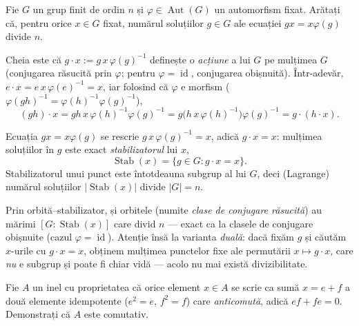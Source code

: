 \begin{problema}
Fie $G$ un grup finit de ordin $n$ și $\varphi\in\operatorname{Aut}(G)$
un automorfism fixat. Arătați că, pentru orice $x\in G$ fixat,
numărul soluțiilor $g\in G$ ale ecuației $gx=x\varphi(g)$ divide
$n$.
\end{problema}

\begin{solutie}
Cheia este că $g\cdot x:=g\,x\,\varphi(g)^{-1}$ definește o
\emph{acțiune} a lui $G$ pe mulțimea $G$ (conjugarea răsucită
prin $\varphi$; pentru $\varphi=\operatorname{id}$, conjugarea obișnuită).
Într-adevăr, $e\cdot x=e\,x\,\varphi(e)^{-1}=x$, iar folosind că
$\varphi$ e morfism ($\varphi(gh)^{-1}=\varphi(h)^{-1}\varphi(g)^{-1}$),
\[
  (gh)\cdot x=gh\,x\,\varphi(h)^{-1}\varphi(g)^{-1}
  =g\bigl(h\,x\,\varphi(h)^{-1}\bigr)\varphi(g)^{-1}=g\cdot(h\cdot x).
\]

Ecuația $gx=x\varphi(g)$ se rescrie $g\,x\,\varphi(g)^{-1}=x$, adică
$g\cdot x=x$: mulțimea soluțiilor în $g$ este exact
\emph{stabilizatorul} lui $x$,
\[
  \operatorname{Stab}(x)=\{g\in G : g\cdot x=x\}.
\]
Stabilizatorul unui punct este întotdeauna subgrup al lui $G$, deci
(Lagrange) numărul soluțiilor $|\!\operatorname{Stab}(x)|$ divide
$|G|=n$.
\end{solutie}

\begin{obs}
Prin orbită--stabilizator, și orbitele (numite \emph{clase de
conjugare răsucită}) au mărimi $[G:\operatorname{Stab}(x)]$ care
divid $n$ --- exact ca la clasele de conjugare obișnuite (cazul
$\varphi=\operatorname{id}$). Atenție însă la varianta
\emph{duală}: dacă fixăm $g$ și căutăm $x$-urile cu
$g\cdot x=x$, obținem mulțimea punctelor fixe ale permutării
$x\mapsto g\cdot x$, care \emph{nu} e subgrup și poate fi chiar vidă
--- acolo nu mai există divizibilitate.
\end{obs}

\begin{problema}
Fie $A$ un inel cu proprietatea că orice element $x\in A$ se scrie ca
sumă $x=e+f$ a două elemente idempotente ($e^{2}=e$, $f^{2}=f$) care
\emph{anticomută}, adică $ef+fe=0$. Demonstrați că $A$ este
comutativ.
\end{problema}


